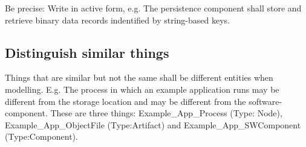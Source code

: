 Be precise: Write in active form, e.g. The persistence component shall store and retrieve
binary data records indentified by string-based keys.

\subsection{Distinguish similar things}

Things that are similar but not the same shall be different entities when modelling.
E.g. The process in which an example application runs may
be different from the storage location and may be different from the software-component.
These are three things:
Example\_App\_Process (Type: Node), Example\_App\_ObjectFile (Type:Artifact) and Example\_App\_SWComponent (Type:Component).

